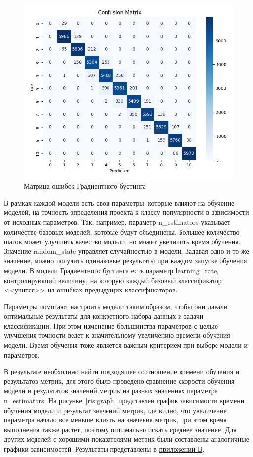\begin{figure}[h]
    \centering
    \includegraphics[width=1\linewidth]{pic/classification/gradient_boosting.png}
    \vspace{0.5em}\caption{Матрица ошибок Градиентного бустинга}
    \label{ris:class}
\end{figure}
\vspace{1em}

В рамках каждой модели есть свои параметры, которые влияют на обучение моделей, на точность определения проекта к классу популярности в зависимости от исходных параметров. Так, например, параметр n\_estimators указывает количество базовых моделей, которые будут объединены. Большее количество шагов может улучшить качество модели, но может увеличить время обучения. Значение random\_state управляет случайностью в модели. Задавая одно и то же значение, можно получить одинаковые результаты при каждом запуске обучения модели. В модели Градиентного бустинга есть параметр learning\_rate, контролирующий величину, на которую каждый базовый классификатор <<учится>> на ошибках предыдущих классификаторов.

Параметры помогают настроить модели таким образом, чтобы они давали оптимальные результаты для конкретного набора данных и задачи классификации. При этом изменение большинства параметров с целью улучшения точности ведет к значительному увеличению времени обучения модели. Время обучения тоже является важным критерием при выборе модели и параметров. 

В результате необходимо найти подходящее соотношение времени обучения и результатов метрик, для этого было проведено сравнение скорости обучения модели и результатов значений метрик на разных значениях параметра n\_estimators. На рисунке~\ref{ris:graph} представлен график зависимости времени обучения модели и результат значений метрик, где видно, что увеличение параметра начало все меньше влиять на значения метрик, при этом время выполнения также растет, поэтому оптимально искать среднее значение. Для других моделей с хорошими показателями метрик были составлены аналогичные графики зависимостей. Результаты представлены в \hyperref[sec:graphics]{приложении В}. 

